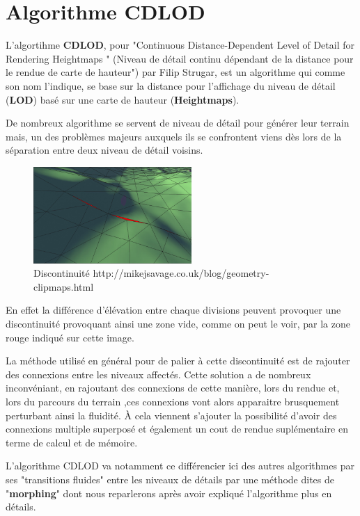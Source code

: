 \documentclass[12pt]{report}
\begin{document}
  \chapter{Algorithme CDLOD}

  L'algortihme \textbf{CDLOD}, pour "Continuous Distance-Dependent Level of Detail for Rendering Heightmaps " 
  (Niveau de détail continu dépendant de la distance pour le rendue de carte de hauteur") par Filip Strugar, 
  est un algorithme qui comme son nom l'indique, se base sur la distance pour l'affichage du niveau de détail 
  (\textbf{LOD}) basé sur une carte de hauteur (\textbf{Heightmaps}).

  De nombreux algorithme se servent de niveau de détail pour générer leur terrain mais,
  un des problèmes majeurs auxquels ils se confrontent viens dès lors de la séparation entre deux niveau de détail voisins.\\
 \begin{figure}
 \includegraphics[width=6cm]{img/seams.png}
   \caption{Discontinuité http://mikejsavage.co.uk/blog/geometry-clipmaps.html}
   \label{fig:seams}
 \end{figure}
 
 \vspace{0.5cm}
 En effet la différence d'élévation entre chaque divisions peuvent provoquer une discontinuité provoquant ainsi une zone vide, 
 comme on peut le voir, par la zone rouge indiqué sur cette image. 
 
 
 \vspace{2.8cm}
 La méthode utilisé en général pour de palier à cette discontinuité est de rajouter des connexions entre les niveaux affectés. 
 Cette solution a de nombreux inconvéniant, en rajoutant des connexions de cette manière, lors du rendue et, lors du parcours du terrain ,ces connexions vont alors apparaitre brusquement perturbant ainsi la fluidité. À cela viennent s'ajouter la possibilité d'avoir des connexions multiple superposé et également un cout de rendue suplémentaire en terme de calcul et de mémoire.
 
 L'algorithme CDLOD va notamment ce différencier ici des autres algorithmes par ses "transitions fluides" entre les niveaux de détails par une méthode dites de "\textbf{morphing}" dont nous reparlerons après avoir expliqué l'algorithme plus en détails.
 
\end{document}

